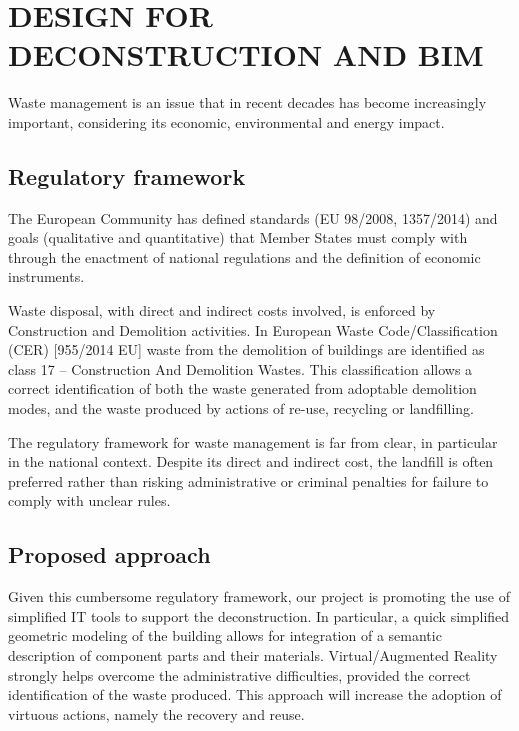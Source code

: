 \section{\uppercase{Design for Deconstruction and BIM}}
\label{sec:deconstruction}

\noindent
Waste management is an issue that in recent decades has become increasingly important, considering its economic, environmental and energy  impact.

\vspace{-3mm}\subsection{Regulatory framework}\vspace{-3mm}
\label{sec:CER}

The European Community has defined standards (EU 98/2008, 1357/2014) and goals (qualitative and quantitative) that Member States must comply with through the enactment of national regulations and the definition of economic instruments.

Waste disposal, with direct and indirect costs involved, is enforced by Construction and Demolition activities. In European Waste Code/Classification (CER) [955/2014 EU] waste from the demolition of buildings are identified as class 17 -- Construction And Demolition Wastes. 
This classification allows a correct identification of both the waste generated from adoptable demolition modes, and the waste produced by actions of re-use, recycling or landfilling.
 
The regulatory framework for waste management is far from clear, in particular in the national context. Despite its direct and indirect cost, the landfill is often preferred rather than risking administrative or criminal penalties for failure to comply with unclear rules.  

\vspace{-3mm}\subsection{Proposed approach}\vspace{-3mm}

Given this cumbersome regulatory framework, our project is promoting the use of simplified IT tools to support the deconstruction. In particular, a quick simplified geometric modeling of the building allows for integration of a semantic description of component parts and their materials. Virtual/Augmented Reality  strongly helps overcome the administrative difficulties, provided the correct identification of the waste produced.
This approach will increase the adoption of virtuous actions, namely the recovery and reuse.

